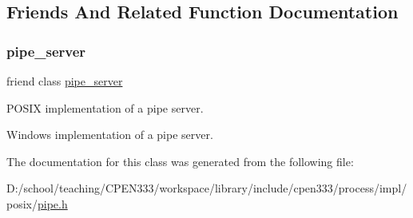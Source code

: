\subsection{Friends And Related Function Documentation}
\mbox{\label{classcpen333_1_1process_1_1posix_1_1pipe_ab111e84ef31179e72c2bd2e58e2042b0}} 
\subsubsection{\texorpdfstring{pipe\+\_\+server}{pipe\_server}}
{\footnotesize\ttfamily friend class \hyperlink{classcpen333_1_1process_1_1posix_1_1pipe__server}{pipe\+\_\+server}\hspace{0.3cm}{\ttfamily [friend]}}



P\+O\+S\+IX implementation of a pipe server. 

Windows implementation of a pipe server. 

The documentation for this class was generated from the following file\+:\begin{DoxyCompactItemize}
\item 
D\+:/school/teaching/\+C\+P\+E\+N333/workspace/library/include/cpen333/process/impl/posix/\hyperlink{impl_2posix_2pipe_8h}{pipe.\+h}\end{DoxyCompactItemize}
